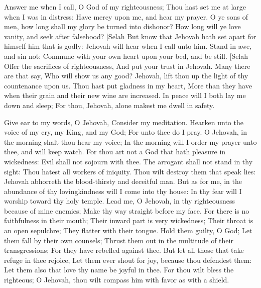 Answer me when I call, O God of my righteousness; Thou hast set me at large when I was in distress: Have mercy upon me, and hear my prayer.  O ye sons of men, how long shall my glory be turned into dishonor? How long will ye love vanity, and seek after falsehood? [Selah  But know that Jehovah hath set apart for himself him that is godly: Jehovah will hear when I call unto him.  Stand in awe, and sin not: Commune with your own heart upon your bed, and be still. [Selah  Offer the sacrifices of righteousness, And put your trust in Jehovah.  Many there are that say, Who will show us any good? Jehovah, lift thou up the light of thy countenance upon us.  Thou hast put gladness in my heart, More than they have when their grain and their new wine are increased.  In peace will I both lay me down and sleep; For thou, Jehovah, alone makest me dwell in safety. 

Give ear to my words, O Jehovah, Consider my meditation.  Hearken unto the voice of my cry, my King, and my God; For unto thee do I pray.  O Jehovah, in the morning shalt thou hear my voice; In the morning will I order my prayer unto thee, and will keep watch.  For thou art not a God that hath pleasure in wickedness: Evil shall not sojourn with thee.  The arrogant shall not stand in thy sight: Thou hatest all workers of iniquity.  Thou wilt destroy them that speak lies: Jehovah abhorreth the blood-thirsty and deceitful man.  But as for me, in the abundance of thy lovingkindness will I come into thy house: In thy fear will I worship toward thy holy temple.  Lead me, O Jehovah, in thy righteousness because of mine enemies; Make thy way straight before my face.  For there is no faithfulness in their mouth; Their inward part is very wickedness; Their throat is an open sepulchre; They flatter with their tongue.  Hold them guilty, O God; Let them fall by their own counsels; Thrust them out in the multitude of their transgressions; For they have rebelled against thee.  But let all those that take refuge in thee rejoice, Let them ever shout for joy, because thou defendest them: Let them also that love thy name be joyful in thee.  For thou wilt bless the righteous; O Jehovah, thou wilt compass him with favor as with a shield. 


